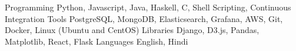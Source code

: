 
\begin{cvskills}

  \cvskill
    {Programming}
    {Python, Javascript, Java, Haskell, C, Shell Scripting, Continuous Integration}
  \cvskill
    {Tools}
    {PostgreSQL, MongoDB, Elasticsearch, Grafana, AWS, Git, Docker, Linux (Ubuntu and CentOS)}
  \cvskill
    {Libraries}
    {Django, D3.js, Pandas, Matplotlib, React, Flask}
  \cvskill
    {Languages}
    {English, Hindi}
\end{cvskills}
